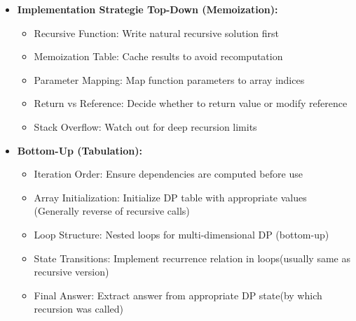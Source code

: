 \documentclass[a4paper,10pt]{book}
\begin{document}
\begin{itemize}[leftmargin=*]
    \item \textbf{Implementation Strategie Top-Down (Memoization):}
    \begin{itemize}
        \item Recursive Function: Write natural recursive solution first
        \item Memoization Table: Cache results to avoid recomputation
        \item Parameter Mapping: Map function parameters to array indices
        \item Return vs Reference: Decide whether to return value or modify reference
        \item Stack Overflow: Watch out for deep recursion limits
    \end{itemize}

    \item \textbf{Bottom-Up (Tabulation):}
    \begin{itemize}
        \item Iteration Order: Ensure dependencies are computed before use
        \item Array Initialization: Initialize DP table with appropriate values (Generally reverse of recursive calls)
        \item Loop Structure: Nested loops for multi-dimensional DP (bottom-up)
        \item State Transitions: Implement recurrence relation in loops(usually same as recursive version)
        \item Final Answer: Extract answer from appropriate DP state(by which recursion was called)
    \end{itemize}
\end{itemize}
\end{document}

